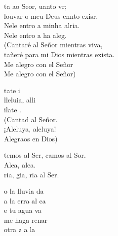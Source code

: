 \documentclass[12pt]{article}
\begin{document}
\begin{multicols*}{2}
\begin{cancion}%
	ta ao Seor, uanto vr;\\
	louvar o meu Deus ennto exisr.\\
	Nele entro a minha alria.\\
	Nele entro a ha aleg.\\
(Cantaré al Señor mientras viva, \\
 tañeré para mi Dios mientras exista.\\
 Me alegro con el Señor\\
 Me alegro con el Señor)\\
\end{cancion}%

\begin{cancion}%
	tate i\\
	lleluia, alli\\
	ilate .\\
(Cantad al Señor.\\
¡Aleluya, aleluya!\\
 Alegraos en Dios)\\
\end{cancion}%

\begin{cancion}%
	temos al Ser, camos al Sor.\\
	Alea, alea.\\
	ria, gia, ria al Ser.\\
\end{cancion}%

\begin{cancion}%
	o la lluvia da \\
	a la erra al ca\\
	e tu agua va\\
	 me haga renar\\
	otra z a la  \\
\end{cancion}%


\end{multicols*}
\end{document}
